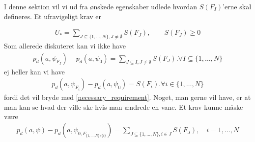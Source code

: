\documentclass[a4paper, 12pt]{memoir}
\begin{document}
I denne sektion vil vi ud fra ønskede egenskaber udlede hvordan $S(F_I)$'erne skal defineres. Et ufravigeligt krav er

\begin{align}
U_*=\sum_{J\subseteq \{1, \dots, N\}, J\neq \emptyset}S(F_J),\qquad S(F_J)\geq0\label{necessary_requirement}
\end{align}
Som allerede diskuteret kan vi ikke have 
\begin{align*}
p_d(a,\psi_{F_I})-p_d(a, \psi_0)=\sum_{J\subseteq I, J\neq \emptyset}S(F_J). \forall I\subseteq \{1,\dots, N\}
\end{align*}
ej heller kan vi have
\begin{align*}
p_d(a,\psi_{F_i})-p_d(a, \psi_0)=S(F_i). \forall i\in \{1,\dots, N\}
\end{align*}
fordi det vil bryde med \eqref{necessary_requirement}. Noget, man gerne vil have, er at man kan se hvad der ville ske hvis man ændrede en vane. Et krav kunne måske være
\begin{align*}
p_d(a,\psi)-p_d(a, \psi_{0, F_{\{1, \dots, N\}\setminus \{i\}}})=\sum_{J\subseteq \{1, \dots, N\},i\in  J}S(F_J), \quad i=1, \dots, N
\end{align*}

%
%
%
%
%
\end{document}
